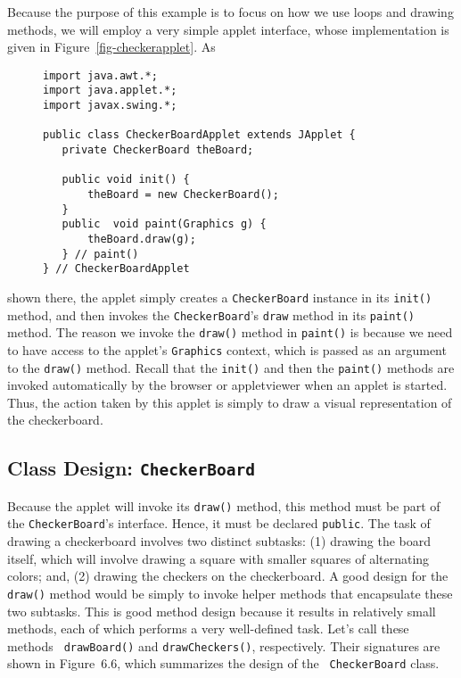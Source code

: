 Because the purpose of this example is to focus on how we use loops
and drawing methods, we will employ a very simple applet interface,
whose implementation is given in Figure~\ref{fig-checkerapplet}.  As
\begin{figure}[h]
\jjjprogstart
\begin{jjjlisting}
\begin{lstlisting}
import java.awt.*;
import java.applet.*;
import javax.swing.*;

public class CheckerBoardApplet extends JApplet {
   private CheckerBoard theBoard;

   public void init() {
       theBoard = new CheckerBoard();
   }
   public  void paint(Graphics g) {
       theBoard.draw(g);
   } // paint()
} // CheckerBoardApplet
\end{lstlisting}
\end{jjjlisting}
\end{figure}
shown there, the applet simply creates a {\tt CheckerBoard} instance
in its {\tt init()} method, and then invokes the {\tt CheckerBoard}'s
{\tt draw} method in its {\tt paint()} method. The reason we invoke
the {\tt draw()} method in {\tt paint()} is because we need to have
access to the applet's {\tt Graphics} context, which is passed as an
argument to the {\tt draw()} method. Recall that the {\tt init()} and
then the {\tt paint()} methods are invoked automatically by the
browser or appletviewer when an applet is started.  Thus, the action
taken by this applet is simply to draw a visual representation of the
checkerboard.


\subsection*{Class Design: {\tt CheckerBoard}}
\noindent Because the applet will invoke its {\tt draw()} method, this
method must be part of the {\tt CheckerBoard}'s interface.  Hence, it
must be declared {\tt public}.  The task of drawing a checkerboard
involves two distinct subtasks: (1) drawing the board itself, which
will involve drawing a square with smaller squares of alternating
colors; and, (2) drawing the checkers on the checkerboard.  A good
design for the {\tt draw()} method would be simply to invoke helper
methods that encapsulate these two subtasks. This is good method
design because it results in relatively small methods, each of which
performs a very well-defined task.  Let's call these methods {\tt
drawBoard()} and {\tt drawCheckers()}, respectively.  Their signatures
are shown in Figure~6.6, which summarizes the design of the {\tt
CheckerBoard} class.

